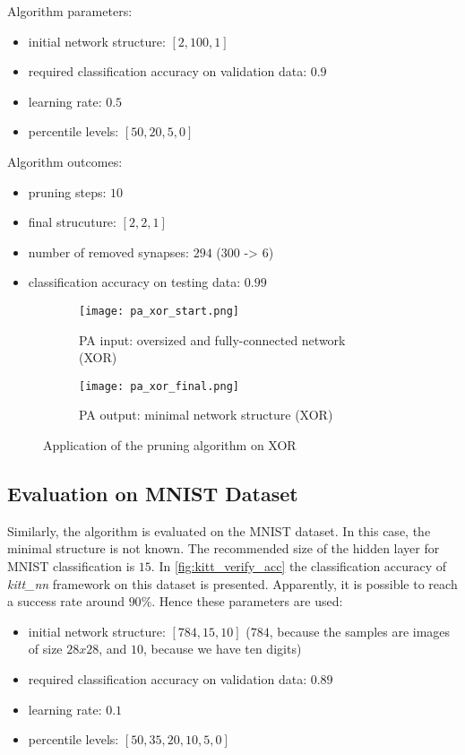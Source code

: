 Algorithm parameters:
\begin{itemize}
\item initial network structure: $ [2, 100, 1] $
\item required classification accuracy on validation data: $ 0.9 $
\item learning rate: $ 0.5 $
\item percentile levels: $ [50, 20, 5, 0] $
\end{itemize}

Algorithm outcomes:
\begin{itemize}
\item pruning steps: $ 10 $
\item final strucuture: $ [2, 2, 1] $
\item number of removed synapses: $ 294 $ ($ 300 $ -> $ 6 $)
\item classification accuracy on testing data: $ 0.99 $
\end{itemize}

\begin{figure}[H]
\centering
\begin{subfigure}{0.45\textwidth}
  \centering
  \texttt{[image: pa\_xor\_start.png]}
  \caption{PA input: oversized and fully-connected network (XOR)}
  \label{img:pa_xor_start}
\end{subfigure}%
\begin{subfigure}{0.45\textwidth}
  \centering
  \texttt{[image: pa\_xor\_final.png]}
  \caption{PA output: minimal network structure (XOR)}
  \label{img:pa_xor_final}
\end{subfigure}
\caption{Application of the pruning algorithm on XOR}
\label{img:pa_xor_morph}
\end{figure}

\subsection{Evaluation on MNIST Dataset} \label{ssec:evaluation_on_mnist}
Similarly, the algorithm is evaluated on the MNIST dataset. In this case, the minimal structure is not known. The recommended size of the hidden layer for MNIST classification is $ 15 $. In \cref{fig:kitt_verify_acc} the classification accuracy of \textit{kitt\_nn} framework on this dataset is presented. Apparently, it is possible to reach a success rate around $ 90\% $. Hence these parameters are used:

\begin{itemize}
\item initial network structure: $ [784, 15, 10] $ ($ 784 $, because the samples are images of size $ 28x28 $, and $ 10 $, because we have ten digits)
\item required classification accuracy on validation data: $ 0.89 $
\item learning rate: $ 0.1 $
\item percentile levels: $ [50, 35, 20, 10, 5, 0] $
\end{itemize}


